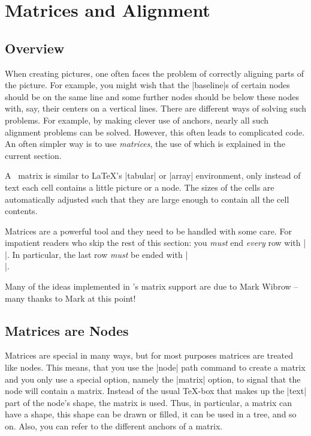 %
%
%


\section[tikz-matrices]{Matrices and Alignment}
\label{section-matrices}

\subsection{Overview}

When creating pictures, one often faces the problem of correctly aligning parts
of the picture. For example, you might wish that the |baseline|s of certain
nodes should be on the same line and some further nodes should be below these
nodes with, say, their centers on a vertical lines. There are different ways of
solving such problems. For example, by making clever use of anchors, nearly all
such alignment problems can be solved. However, this often leads to complicated
code. An often simpler way is to use \emph{matrices}, the use of which is
explained in the current section.

A \tikzname\ matrix is similar to \LaTeX's |{tabular}| or |{array}|
environment, only instead of text each cell contains a little picture or a
node. The sizes of the cells are automatically adjusted such that they are
large enough to contain all the cell contents.

Matrices are a powerful tool and they need to be handled with some care. For
impatient readers who skip the rest of this section: you \emph{must} end
\emph{every} row with |\\|. In particular, the last row \emph{must} be ended
with |\\|.

Many of the ideas implemented in \tikzname's matrix support are due to Mark
Wibrow -- many thanks to Mark at this point!


\subsection{Matrices are Nodes}

Matrices are special in many ways, but for most purposes matrices are treated
like nodes. This means, that you use the |node| path command to create a matrix
and you only use a special option, namely the |matrix| option, to signal that
the node will contain a matrix. Instead of the usual \TeX-box that makes up the
|text| part of the node's shape, the matrix is used. Thus, in particular, a
matrix can have a shape, this shape can be drawn or filled, it can be used in a
tree, and so on. Also, you can refer to the different anchors of a matrix.

